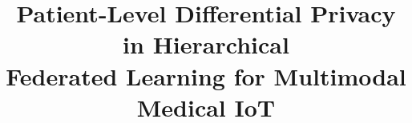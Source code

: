 

\title{Patient-Level Differential Privacy in Hierarchical\\
       Federated Learning for Multimodal Medical IoT}

\newif\ifcollegeauthors
\collegeauthorstrue
\ifcollegeauthors
